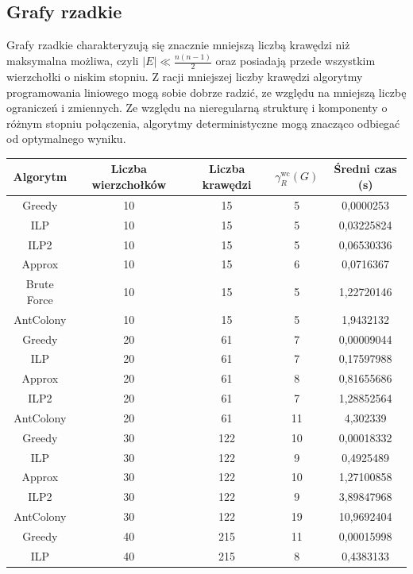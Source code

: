 \subsection{Grafy rzadkie}

Grafy rzadkie charakteryzują się znacznie mniejszą liczbą krawędzi niż maksymalna możliwa, czyli $|E| \ll \frac{n(n - 1)}{2}$ oraz posiadają przede wszystkim wierzchołki o niskim stopniu. Z racji mniejszej liczby krawędzi algorytmy programowania liniowego mogą sobie dobrze radzić, ze względu na mniejszą liczbę ograniczeń i zmiennych. Ze względu na nieregularną strukturę i komponenty o różnym stopniu połączenia, algorytmy deterministyczne mogą znacząco odbiegać od optymalnego wyniku.

\begin{table}[H]
    \centering
    \begin{tabular}{|c|c|c|c|c|}
    \hline
    Algorytm & Liczba wierzchołków & Liczba krawędzi & $\gamma^{\text{wc}}_R(G)$ & Średni czas (s) \\
    \hline
    Greedy	   & 10 &	15 &	5	 &   0,0000253	\\		
    ILP	       & 10 &	15 &	5	  &   0,03225824 \\
    ILP2	   & 10 &	15 &	5	  &   0,06530336 \\
    Approx	   & 10 &	15 &	6	  &   0,0716367 \\
    Brute Force & 10 &	15 &	5 	 &   1,22720146 \\
    AntColony & 10 &	15 &	5 	 &   1,9432132 \\
    \hline
    Greedy     &  20 & 61 & 7    &  0,00009044 \\     
    ILP        &  20 & 61 & 7    &   0,17597988 \\
    Approx     &  20 & 61 & 8    &    0,81655686 \\   
    ILP2       &  20 & 61 & 7    &   1,28852564 \\    
    AntColony  &  20 & 61 & 11   &   4,302339 \\         
    \hline
    Greedy & 30 & 122 & 10 & 0,00018332 \\
    ILP & 30 & 122 & 9 & 0,4925489 \\
    Approx & 30 & 122 & 10 & 1,27100858 \\
    ILP2 & 30 & 122 & 9 & 3,89847968 \\
    AntColony & 30 & 122 & 19 & 10,9692404 \\
    \hline
    Greedy & 40 & 215 & 11 & 0,00015998 \\
    ILP & 40 & 215 & 8 & 0,4383133 \\

\end{tabular}
\end{table}
